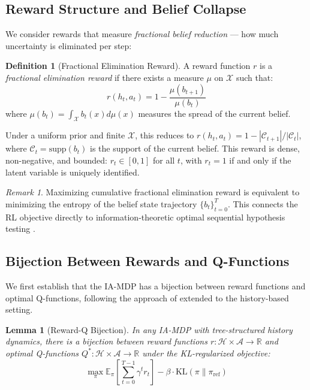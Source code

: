 \documentclass[11pt]{article}
\theoremstyle{plain}
\newtheorem{lemma}[theorem]{Lemma}
\theoremstyle{definition}
\newtheorem{definition}[theorem]{Definition}
\theoremstyle{remark}
\newtheorem{remark}[theorem]{Remark}
\begin{document}
\subsection{Reward Structure and Belief Collapse}

We consider rewards that measure \emph{fractional belief 
reduction} — how much uncertainty is eliminated per step:

\begin{definition}[Fractional Elimination Reward]
\label{def:reward}
A reward function $r$ is a \emph{fractional elimination reward} 
if there exists a measure $\mu$ on $\mathcal{X}$ such that:
$$r(h_t, a_t) = 1 - \frac{\mu(b_{t+1})}{\mu(b_t)}$$
where $\mu(b_t) = \int_\mathcal{X} b_t(x) d\mu(x)$ measures 
the spread of the current belief.
\end{definition}

Under a uniform prior and finite $\mathcal{X}$, this reduces to
$r(h_t, a_t) = 1 - |\mathcal{C}_{t+1}|/|\mathcal{C}_t|$,
where $\mathcal{C}_t = \mathrm{supp}(b_t)$ is the support of 
the current belief. This reward is dense, non-negative, and 
bounded: $r_t \in [0, 1]$ for all $t$, with $r_t = 1$ 
if and only if the latent variable is uniquely identified.

\begin{remark}
Maximizing cumulative fractional elimination reward is equivalent 
to minimizing the entropy of the belief state trajectory 
$\{b_t\}_{t=0}^T$. This connects the RL objective directly to 
information-theoretic optimal sequential hypothesis testing 
\citep{wald1947sequential}.
\end{remark}

\subsection{Bijection Between Rewards and Q-Functions}

We first establish that the IA-MDP has a bijection between 
reward functions and optimal Q-functions, following the approach 
of \citet{rafailov2024r} extended to the history-based setting.

\begin{lemma}[Reward-Q Bijection]
\label{lem:bijection}
In any IA-MDP with tree-structured history dynamics, there is 
a bijection between reward functions $r: \mathcal{H} \times 
\mathcal{A} \rightarrow \mathbb{R}$ and optimal Q-functions 
$Q^*: \mathcal{H} \times \mathcal{A} \rightarrow \mathbb{R}$ 
under the KL-regularized objective:
$$\max_\pi \mathbb{E}_\pi\left[\sum_{t=0}^{T-1} \gamma^t r_t\right] 
- \beta \cdot \mathrm{KL}(\pi \| \pi_\mathrm{ref})$$
\end{lemma}
\end{document}
